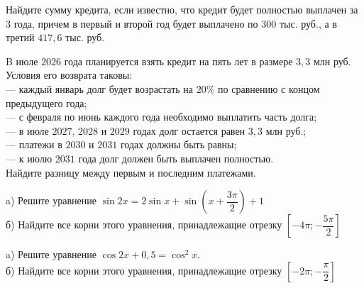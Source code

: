 \begin{consultation}
\begin{listofex}
		Найдите сумму кредита, если известно, что кредит будет полностью выплачен за 3 года, причем в первый и второй год будет выплачено по \( 300 \) тыс. руб., а в третий \( 417,6 \) тыс. руб.
		\item B июле \( 2026 \) года планируется взять кредит на пять лет в размере \( 3,3 \) млн руб. Условия его возврата таковы:\\
		— каждый январь долг будет возрастать на \( 20\% \) по сравнению с концом предыдущего года;\\
		— с февраля по июнь каждого года необходимо выплатить часть долга;\\
		— в июле \( 2027 \), \( 2028 \) и \( 2029 \) годах долг остается равен \( 3,3 \) млн руб.;\\
		— платежи в \( 2030 \) и \( 2031 \) годах должны быть равны;\\
		— к июлю \( 2031 \) года долг должен быть выплачен полностью.\\
		Найдите разницу между первым и последним платежами.
		\item a) Решите уравнение \( \sin2x=2\sin x + \sin \left( x+\dfrac{ 3\pi }{ 2 } \right)+1\) \\
		б) Найдите все корни этого уравнения, принадлежащие отрезку \( \left[ - 4\pi; -\dfrac{5\pi}{2} \right]  \)
		\item a) Решите уравнение \( \cos2x+0,5=\cos^2x \). \\
		б) Найдите все корни этого уравнения, принадлежащие отрезку \( \left[ -2\pi;-\dfrac{\pi}{2} \right]  \)
	\end{listofex}
\end{consultation}
